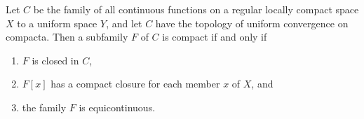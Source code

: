 Let $C$ be the family of all continuous functions on a regular locally compact space $X$ to a uniform space $Y$, and let $C$ have the topology of uniform convergence on compacta. Then a subfamily $F$ of $C$ is compact if and only if

\begin{enumerate}
\item[(a)] $F$ is closed in $C$,
\item[(b)] $F[x]$ has a compact closure for each member $x$ of $X$, and
\item[(c)] the family $F$ is equicontinuous.
\end{enumerate}

